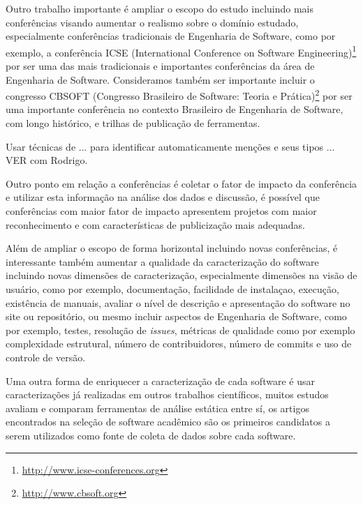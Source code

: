 Outro trabalho importante é ampliar o escopo do estudo incluindo mais
conferências visando aumentar o realismo sobre o domínio estudado,
especialmente conferências tradicionais de Engenharia de Software, como por
exemplo, a conferência ICSE (International Conference on Software
Engineering)\footnote{\url{http://www.icse-conferences.org}} por ser uma das
mais tradicionais e importantes conferências da área de Engenharia de Software.
Consideramos também ser importante incluir o congresso CBSOFT (Congresso
Brasileiro de Software: Teoria e Prática)\footnote{\url{http://www.cbsoft.org}}
por ser uma importante conferência no contexto Brasileiro de Engenharia de
Software, com longo histórico, e trilhas de publicação de ferramentas.

Usar técnicas de ... para identificar automaticamente menções e seus tipos ...
VER com Rodrigo.


Outro ponto em relação a conferências é coletar o fator de impacto da
conferência e utilizar esta informação na análise dos dados e discussão, é
possível que conferências com maior fator de impacto apresentem projetos com
maior reconhecimento e com características de publicização mais adequadas.

Além de ampliar o escopo de forma horizontal incluindo novas conferências, é
interessante também aumentar a qualidade da caracterização do software
incluindo novas dimensões de caracterização, especialmente dimensões na visão
de usuário, como por exemplo, documentação, facilidade de instalaçao, execução,
existência de manuais, avaliar o nível de descrição e apresentação do software
no site ou repositório, ou mesmo incluir aspectos de Engenharia de Software,
como por exemplo, testes, resolução de {\it issues}, métricas de qualidade como
por exemplo complexidade estrutural, número de contribuidores, número de
commits e uso de controle de versão.


Uma outra forma de enriquecer a caracterização de cada software é usar
caracterizações já realizadas em outros trabalhos científicos, muitos estudos
avaliam e comparam ferramentas de análise estática entre sí, os artigos
encontrados na seleção de software acadêmico são os primeiros candidatos a
serem utilizados como fonte de coleta de dados sobre cada software.

